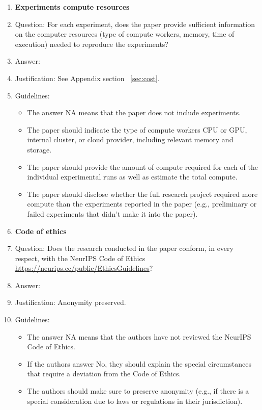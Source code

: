 \documentclass{article}
\begin{document}
\begin{enumerate}
\item {\bf Experiments compute resources}
    \item[] Question: For each experiment, does the paper provide sufficient information on the computer resources (type of compute workers, memory, time of execution) needed to reproduce the experiments?
    \item[] Answer: \answerYes{} %
    \item[] Justification: See Appendix section ~\ref{sec:cost}.
    \item[] Guidelines:
    \begin{itemize}
        \item The answer NA means that the paper does not include experiments.
        \item The paper should indicate the type of compute workers CPU or GPU, internal cluster, or cloud provider, including relevant memory and storage.
        \item The paper should provide the amount of compute required for each of the individual experimental runs as well as estimate the total compute. 
        \item The paper should disclose whether the full research project required more compute than the experiments reported in the paper (e.g., preliminary or failed experiments that didn't make it into the paper). 
    \end{itemize}
    
\item {\bf Code of ethics}
    \item[] Question: Does the research conducted in the paper conform, in every respect, with the NeurIPS Code of Ethics \url{https://neurips.cc/public/EthicsGuidelines}?
    \item[] Answer: \answerYes{} %
    \item[] Justification: Anonymity preserved. 
    \item[] Guidelines:
    \begin{itemize}
        \item The answer NA means that the authors have not reviewed the NeurIPS Code of Ethics.
        \item If the authors answer No, they should explain the special circumstances that require a deviation from the Code of Ethics.
        \item The authors should make sure to preserve anonymity (e.g., if there is a special consideration due to laws or regulations in their jurisdiction).
    \end{itemize}



\end{enumerate}
\end{document}
